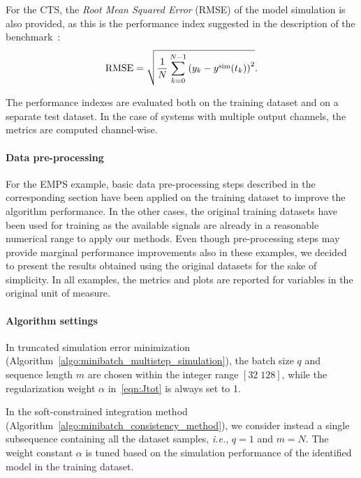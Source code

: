 \documentclass{article} %
\newcommand{\batchsize}{q}
\newcommand{\seqlen}{m}
\newcommand{\nsamp}{N}
\newcommand{\simul}[1]{{#1}^{\rm sim}}
\begin{document}
For the CTS, the \emph{Root Mean Squared Error} (RMSE) of the model simulation is also provided, as this is the performance index suggested  in the description of the benchmark~\cite{schoukens2017three}:
\begin{equation*}
 \mathrm{RMSE} = \sqrt{\frac{1}{\nsamp}\sum_{k=0}^{\nsamp-1} \left(y_k-\simul{y}(t_k)\right)^2}.
\end{equation*}

The performance indexes are evaluated both on the training dataset and on a separate test dataset. In the case of systems with multiple output channels, the metrics are computed channel-wise.
{
\paragraph{Data pre-processing} For the EMPS example, basic data pre-processing steps described in the corresponding section have been applied on the training dataset to improve the algorithm performance.
In the other cases, the original training datasets have been used for training as the available signals are already in a reasonable numerical range to apply our methods.
Even though pre-processing steps may provide marginal performance improvements also in these 
examples, we decided to present the results obtained using the original datasets for the sake of simplicity.
In all examples, the metrics and plots are reported for variables in the original unit of measure.
}
\paragraph{Algorithm settings} 
In truncated simulation error minimization (Algorithm~\ref{algo:minibatch_multistep_simulation}), the batch size $\batchsize$ and sequence length $\seqlen$    are chosen within the integer range $[32\; 128]$, while the regularization  weight  $\alpha$ in~\eqref{eqn:Jtot} is always set to 1.

In the soft-constrained integration method (Algorithm~\ref{algo:minibatch_consistency_method}), we consider instead a single subsequence 
containing all the dataset samples, \emph{i.e.}, $\batchsize=1$ and $\seqlen=\nsamp$. The weight constant $\alpha$ is  tuned based on the simulation performance of the identified model  in the training  dataset. %
\end{document}

